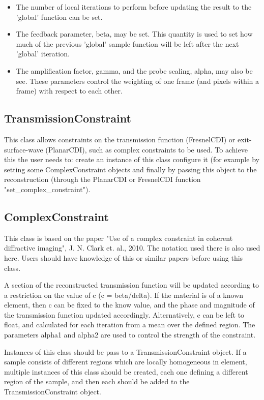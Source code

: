 \documentclass[]{nadia}
\begin{document}
\begin{itemize}
  \item The number of local iterations to perform before updating the
    result to the 'global' function can be set.

  \item The feedback parameter, beta, may be set. This quantity is used
    to set how much of the previous 'global' sample function will be
    left after the next 'global' iteration.

  \item The amplification factor, gamma, and the probe scaling, alpha,
    may also be see. These parameters control the weighting of one frame
    (and pixels within a frame) with respect to each other.

\end{itemize}

\subsection{TransmissionConstraint}
This class allows constraints on the transmission function
(FresnelCDI) or exit-surface-wave (PlanarCDI), such as complex
constraints to be used. To achieve this the user needs to: create an
instance of this class configure it (for example by setting some
ComplexConstraint objects and finally by passing this object to the
reconstruction (through the PlanarCDI or FresnelCDI function
"set\_complex\_constraint").

\subsection{ComplexConstraint}

This class is based on the paper "Use of a complex constraint in
coherent diffractive imaging", J. N. Clark et. al., 2010. The notation
used there is also used here. Users should have knowledge of this or
similar papers before using this class.

A section of the reconstructed transmission function will be updated
according to a restriction on the value of c (c = beta/delta). If the
material is of a known element, then c can be fixed to the know value,
and the phase and magnitude of the transmission function updated
accordingly. Alternatively, c can be left to float, and calculated for
each iteration from a mean over the defined region. The parameters
alpha1 and alpha2 are used to control the strength of the constraint.

Instances of this class should be pass to a TransmissionConstraint
object. If a sample consists of different regions which are locally
homogeneous in element, multiple instances of this class should be
created, each one defining a different region of the sample, and then
each should be added to the TransmissionConstraint object.
\end{document}
